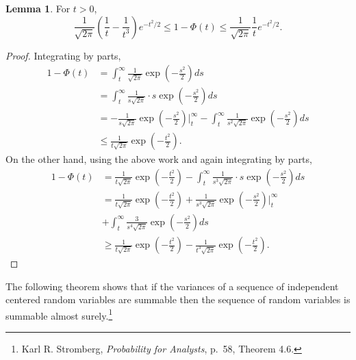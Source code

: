 \documentclass{article}
\theoremstyle{definition}
\newtheorem{lemma}[theorem]{Lemma}
\theoremstyle{definition}
\begin{document}
\begin{lemma}
For $t>0$,
\[
\frac{1}{\sqrt{2\pi}} \left(\frac{1}{t}-\frac{1}{t^3}\right) e^{-t^2/2} \leq 1- \Phi(t) \leq \frac{1}{\sqrt{2\pi}} \frac{1}{t} e^{-t^2/2}.
\]
\end{lemma}
\begin{proof}
Integrating by parts,
\begin{align*}
1-\Phi(t) &= \int_t^\infty \frac{1}{\sqrt{2\pi}} \exp\left(- \frac{s^2}{2} \right) ds\\
&=\int_t^\infty \frac{1}{s \sqrt{2\pi}} \cdot s\exp\left(- \frac{s^2}{2} \right) ds\\
&=- \frac{1}{s\sqrt{2\pi}} \exp\left(- \frac{s^2}{2} \right) \bigg|_t^\infty
-\int_t^\infty \frac{1}{s^2 \sqrt{2\pi}}  \exp\left(- \frac{s^2}{2} \right) ds\\
&\leq \frac{1}{t\sqrt{2\pi}} \exp\left(-\frac{t^2}{2} \right).
\end{align*}
On the other hand, using the above work and again integrating by parts,
\begin{align*}
1-\Phi(t) &= \frac{1}{t\sqrt{2\pi}} \exp\left(-\frac{t^2}{2} \right)-\int_t^\infty \frac{1}{s^3 \sqrt{2\pi}} \cdot s  \exp\left(- \frac{s^2}{2} \right) ds\\
&=\frac{1}{t\sqrt{2\pi}} \exp\left(-\frac{t^2}{2} \right) +
\frac{1}{s^3 \sqrt{2\pi}} \exp\left(-\frac{s^2}{2} \right) \bigg|_t^\infty\\
&+\int_t^\infty \frac{3}{s^4\sqrt{2\pi}} \exp\left(-\frac{s^2}{2} \right) ds\\
&\geq \frac{1}{t\sqrt{2\pi}} \exp\left(-\frac{t^2}{2} \right) - \frac{1}{t^3 \sqrt{2\pi}} \exp\left(-\frac{t^2}{2} \right).
\end{align*}
\end{proof}

The following theorem shows that if the variances of a sequence of independent centered random variables
are summable then the sequence of random variables is summable almost surely.\footnote{Karl R. Stromberg, {\em Probability for Analysts}, p.~58, Theorem 4.6.} 
\end{document}
